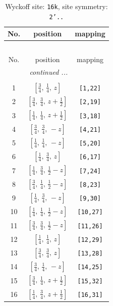 \documentclass[fleqn,8pt]{jsarticle}
\begin{document}
\begin{longtable}{ccc}
\caption{Wyckoff site: {\tt 16k}, site symmetry: {\tt 2'..}}
 \\
 \hline \hline
No. & position & mapping \\ \hline \endfirsthead

\multicolumn{2}{l}{\tablename\ \thetable{}} \\
 \hline \hline
No. & position & mapping \\ \hline \endhead

 \hline \hline
\multicolumn{2}{r}{\footnotesize\it continued ...} \\ \endfoot

 \hline \hline
\multicolumn{2}{r}{} \\ \endlastfoot

1 & $\left[ \frac{3}{4},\, \frac{1}{4},\, z \right]$ & {\tt [1,22]} \\ \hline
2 & $\left[ \frac{3}{4},\, \frac{3}{4},\, z + \frac{1}{2} \right]$ & {\tt [2,19]} \\ \hline
3 & $\left[ \frac{1}{4},\, \frac{1}{4},\, z + \frac{1}{2} \right]$ & {\tt [3,18]} \\ \hline
4 & $\left[ \frac{3}{4},\, \frac{3}{4},\, - z \right]$ & {\tt [4,21]} \\ \hline
5 & $\left[ \frac{1}{4},\, \frac{1}{4},\, - z \right]$ & {\tt [5,20]} \\ \hline
6 & $\left[ \frac{1}{4},\, \frac{3}{4},\, z \right]$ & {\tt [6,17]} \\ \hline
7 & $\left[ \frac{1}{4},\, \frac{3}{4},\, \frac{1}{2} - z \right]$ & {\tt [7,24]} \\ \hline
8 & $\left[ \frac{3}{4},\, \frac{1}{4},\, \frac{1}{2} - z \right]$ & {\tt [8,23]} \\ \hline
9 & $\left[ \frac{1}{4},\, \frac{3}{4},\, - z \right]$ & {\tt [9,30]} \\ \hline
10 & $\left[ \frac{1}{4},\, \frac{1}{4},\, \frac{1}{2} - z \right]$ & {\tt [10,27]} \\ \hline
11 & $\left[ \frac{3}{4},\, \frac{3}{4},\, \frac{1}{2} - z \right]$ & {\tt [11,26]} \\ \hline
12 & $\left[ \frac{1}{4},\, \frac{1}{4},\, z \right]$ & {\tt [12,29]} \\ \hline
13 & $\left[ \frac{3}{4},\, \frac{3}{4},\, z \right]$ & {\tt [13,28]} \\ \hline
14 & $\left[ \frac{3}{4},\, \frac{1}{4},\, - z \right]$ & {\tt [14,25]} \\ \hline
15 & $\left[ \frac{3}{4},\, \frac{1}{4},\, z + \frac{1}{2} \right]$ & {\tt [15,32]} \\ \hline
16 & $\left[ \frac{1}{4},\, \frac{3}{4},\, z + \frac{1}{2} \right]$ & {\tt [16,31]} \\
\end{longtable}
\end{document}

